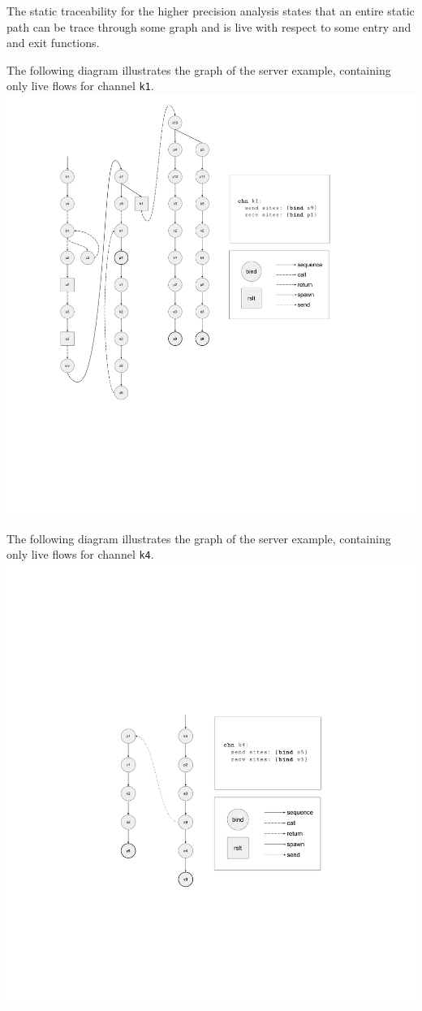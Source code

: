 \documentclass[10pt]{article}
\begin{document}
The static traceability for the higher precision analysis states
that an entire static path can be trace through some graph and
is live with respect to some entry and and exit functions.

The following diagram illustrates the graph of the server example,
containing only live flows for channel \lstinline{k1}.
\includegraphics[width=1.3\textwidth, left]{cml-graph-k1.pdf}

The following diagram illustrates the graph of the server example,
containing only live flows for channel \lstinline{k4}.
\includegraphics[width=1.3\textwidth, left]{cml-graph-k4.pdf}
\end{document}
